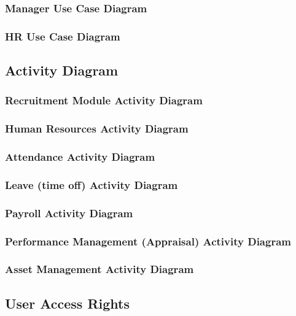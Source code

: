 \subsubsection{Manager Use Case Diagram}

\subsubsection{HR Use Case Diagram}

\subsection{Activity Diagram}

\subsubsection{Recruitment Module Activity Diagram}

\subsubsection{Human Resources Activity Diagram}

\subsubsection{Attendance Activity Diagram}

\subsubsection{Leave (time off) Activity Diagram}

\subsubsection{Payroll Activity Diagram}

\subsubsection{Performance Management (Appraisal) Activity Diagram}

\subsubsection{Asset Management Activity Diagram}


\subsection{User Access Rights}

